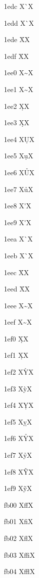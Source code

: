 \documentclass[11pt]{article}
\begin{document}
1edc X{\`{\OHORN}}X

1edd X{\`{\ohorn}}X

1ede X{\h{\OHORN}}X

1edf X{\h{\ohorn}}X

1ee0 X{\~{\OHORN}}X

1ee1 X{\~{\ohorn}}X

1ee2 X{\d{\OHORN}}X

1ee3 X{\d{\ohorn}}X

1ee4 X{\d{U}}X

1ee5 X{\d{u}}X

1ee6 X{\h{U}}X

1ee7 X{\h{u}}X

1ee8 X{\'{\UHORN}}X

1ee9 X{\'{\uhorn}}X

1eea X{\`{\UHORN}}X

1eeb X{\`{\uhorn}}X

1eec X{\h{\UHORN}}X

1eed X{\h{\uhorn}}X

1eee X{\~{\UHORN}}X

1eef X{\~{\uhorn}}X

1ef0 X{\d{\UHORN}}X

1ef1 X{\d{\uhorn}}X

1ef2 X{\`Y}X

1ef3 X{\`y}X

1ef4 X{\d{Y}}X

1ef5 X{\d{y}}X

1ef6 X{\h{Y}}X

1ef7 X{\h{y}}X

1ef8 X{\~Y}X

1ef9 X{\~y}X

fb00 X{ff}X

fb01 X{fi}X

fb02 X{fl}X

fb03 X{ffi}X

fb04 X{ffl}X
\end{document}
